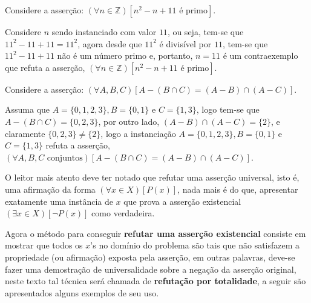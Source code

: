 \begin{exemplo}\label{exe:Refutacao2}
	Considere a asserção: $(\forall n \in \mathbb{Z})[n^2 -n + 11 \text{ é primo}]$.
	
	\begin{refute}
		Considere $n$ sendo instanciado com valor $11$, ou seja, tem-se que $11^2 - 11 + 11 = 11^2$, agora desde que $11^2$ é divisível por $11$, tem-se que $11^2 - 11 + 11$ não é um número primo e, portanto, $n = 11$ é um contraexemplo que refuta a asserção, $(\forall n \in \mathbb{Z})[n^2 -n + 11 \text{ é primo}]$.
	\end{refute}
\end{exemplo}

\begin{exemplo}\label{exe:Refutacao3}
	Considere a asserção: $(\forall A, B, C)[A - (B \cap C) = (A - B) \cap (A - C)]$.
	
	\begin{refute}
		Assuma que $A = \{0, 1, 2, 3\}, B = \{0, 1\}$ e $C = \{1, 3\}$, logo tem-se que $A - (B \cap C) = \{0, 2, 3\}$, por outro lado, $(A - B) \cap (A - C) = \{2\}$, e claramente $\{0, 2, 3\} \neq \{2\}$, logo a instanciação $A = \{0, 1, 2, 3\}, B = \{0, 1\}$ e $C = \{1, 3\}$ refuta a asserção, $(\forall A, B, C \text{ conjuntos})[A - (B \cap C) = (A - B) \cap (A - C)]$.
	\end{refute}
\end{exemplo}

O leitor mais atento deve ter notado que refutar uma asserção universal, isto é, uma afirmação da forma $(\forall x \in X)[P(x)]$, nada mais é do que, apresentar exatamente uma instância de $x$ que prova a asserção existencial $(\exists x \in X)[\neg P(x)]$ como verdadeira.

Agora o método para conseguir \textbf{refutar uma asserção existencial} consiste em mostrar que todos os $x$'s no domínio do problema são tais que não satisfazem a propriedade (ou afirmação) exposta pela asserção, em outras palavras, deve-se fazer uma demostração de universalidade sobre a negação da asserção original, neste texto tal técnica será chamada de \textbf{refutação por totalidade}, a seguir são apresentados alguns exemplos de seu uso.

